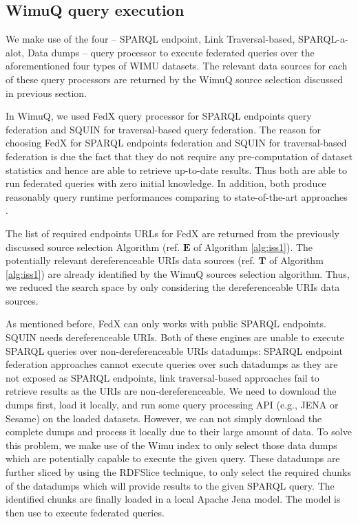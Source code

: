 \subsection{WimuQ query execution}
We make use of the four -- SPARQL endpoint, Link Traversal-based, SPARQL-a-alot, Data dumps -- query processor to execute federated queries over the aforementioned four types of WIMU datasets. The relevant data sources for each of these query processors are returned by the WimuQ source selection discussed in previous section. 

In WimuQ, we used FedX \cite{fedx2011} query processor for SPARQL endpoints query federation and SQUIN for traversal-based query federation. The reason for choosing FedX for SPARQL endpoints federation and SQUIN for traversal-based federation is due the fact that they do not require any pre-computation of dataset statistics and hence are able to retrieve up-to-date results. Thus both are able to run federated queries with zero initial knowledge. In addition, both produce reasonably query runtime performances comparing to state-of-the-art approaches \cite{saleem2015fine,saleem2018costfed,hartig2013squin}.

The list of required endpoints URLs for FedX are returned from the previously discussed source selection Algorithm (ref. $\mathbf{E}$ of Algorithm \ref{alg:iss1}). The potentially relevant dereferenceable URIs data sources (ref. $\mathbf{T}$ of Algorithm \ref{alg:iss1}) are already identified by the WimuQ sources selection algorithm. Thus, we reduced the search space by only considering the dereferenceable URIs data sources. 
 
As mentioned before, FedX can only works with public SPARQL endpoints. SQUIN needs dereferenceable URIs. Both of these engines are unable to execute SPARQL queries over non-dereferenceable URIs datadumps: SPARQL endpoint federation approaches cannot execute queries over such datadumps as they are not exposed as SPARQL endpoints, link traversal-based approaches fail to retrieve results as the URIs are non-dereferenceable. We need to download the dumps first, load it locally, and run some query processing API (e.g., JENA or Sesame) on the loaded datasets. However, we can not simply download the complete dumps and process it locally due to their large amount of data. To solve this problem, we make use of the Wimu index to only select those data dumps which are potentially capable to execute the given query. These datadumps are further sliced by using the RDFSlice technique, to only select the required chunks of the datadumps which will provide results to the given SPARQL query. The identified chunks are finally loaded in a local Apache Jena model. The model is then use to execute federated queries. 


